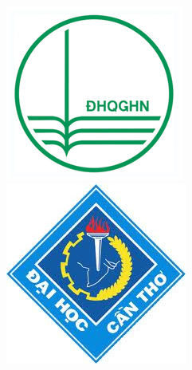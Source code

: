 \begin{titlepage}
\begin{center}
\begin{figure}[!htb]
  \includegraphics[width=\linewidth]{images/unh-logo}
\endminipage\hfill
{}
  \includegraphics[width=\linewidth]{images/ctu-logo}
\endminipage\hfill
\end{figure}


\end{center}
\end{titlepage}
